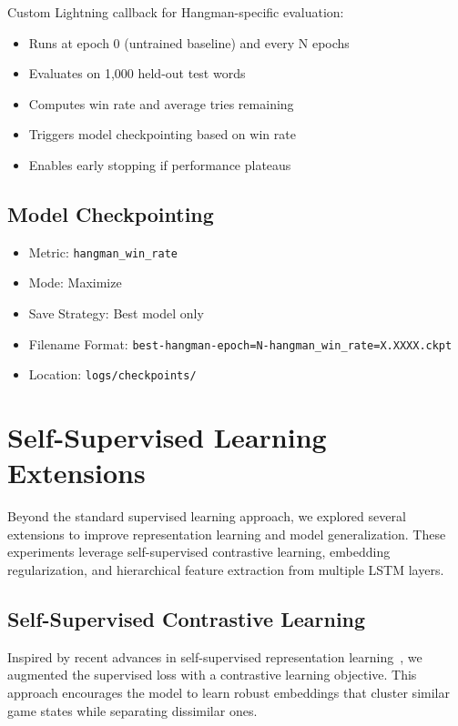 \documentclass[12pt,a4paper]{article}
\begin{document}
Custom Lightning callback for Hangman-specific evaluation:
\begin{itemize}
    \item Runs at epoch 0 (untrained baseline) and every N epochs
    \item Evaluates on 1,000 held-out test words
    \item Computes win rate and average tries remaining
    \item Triggers model checkpointing based on win rate
    \item Enables early stopping if performance plateaus
\end{itemize}

\subsection{Model Checkpointing}

\begin{itemize}
    \item Metric: \texttt{hangman\_win\_rate}
    \item Mode: Maximize
    \item Save Strategy: Best model only
    \item Filename Format: \texttt{best-hangman-epoch=N-hangman\_win\_rate=X.XXXX.ckpt}
    \item Location: \texttt{logs/checkpoints/}
\end{itemize}

\section{Self-Supervised Learning Extensions}

Beyond the standard supervised learning approach, we explored several extensions to improve representation learning and model generalization. These experiments leverage self-supervised contrastive learning, embedding regularization, and hierarchical feature extraction from multiple LSTM layers.

\subsection{Self-Supervised Contrastive Learning}

Inspired by recent advances in self-supervised representation learning~\cite{gao2021simcse}, we augmented the supervised loss with a contrastive learning objective. This approach encourages the model to learn robust embeddings that cluster similar game states while separating dissimilar ones.
\end{document}
